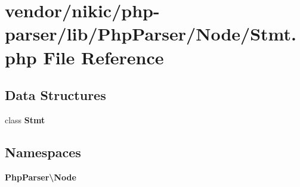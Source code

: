 \section{vendor/nikic/php-\/parser/lib/\+Php\+Parser/\+Node/\+Stmt.php File Reference}
\label{_stmt_8php}
\subsection*{Data Structures}
\begin{DoxyCompactItemize}
\item 
class {\bf Stmt}
\end{DoxyCompactItemize}
\subsection*{Namespaces}
\begin{DoxyCompactItemize}
\item 
 {\bf Php\+Parser\textbackslash{}\+Node}
\end{DoxyCompactItemize}

